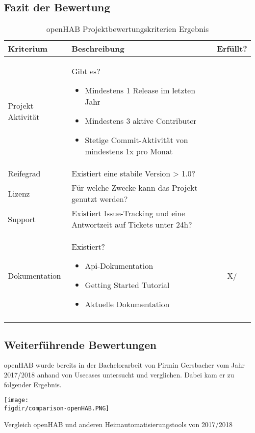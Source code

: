 \subsection{Fazit der Bewertung}
\begin{longtable}{| p{3cm} | p{10cm}| c |}
	\hline
	\textbf{Kriterium} & \textbf{Beschreibung} & \textbf{Erfüllt?} \\
	\hline \hline
	\centering Projekt Aktivität & Gibt es?
	\begin{itemize}
		\item Mindestens 1 Release im letzten Jahr
		\item Mindestens 3 aktive Contributer
		\item Stetige Commit-Aktivität von mindestens 1x pro Monat
	\end{itemize} & \checkmark \\
	\hline
	\centering Reifegrad & Existiert eine stabile Version > 1.0? & \checkmark \\
	\hline
	\centering Lizenz & Für welche Zwecke kann das Projekt genutzt werden? & \checkmark \\
	\hline
	\centering Support & Existiert Issue-Tracking und eine Antwortzeit auf Tickets unter 24h? & \checkmark \\
	\hline
	\centering Dokumentation & Existiert?
	\begin{itemize}
		\item Api-Dokumentation
		\item Getting Started Tutorial
		\item Aktuelle Dokumentation
	\end{itemize} & X/\checkmark \\
	\hline
	\caption{openHAB Projektbewertungskriterien Ergebnis}
	\label{table:openHAB-judgement-criteria-result}
\end{longtable}

\subsection{Weiterführende Bewertungen}
openHAB wurde bereits in der Bachelorarbeit von Pirmin Gersbacher vom Jahr 2017/2018 anhand von Usecases untersucht und verglichen. Dabei kam er zu folgender Ergebnis.

\begin{minipage}{\textwidth}
	\centering
	\captionsetup{type=figure}
	\texttt{[image: \\figdir/comparison-openHAB.PNG]}
	\caption{Vergleich openHAB und anderen Heimautomatisierungstools von 2017/2018 \label{fig:comparison-openHAB}}
\end{minipage}
\smallskip
 

